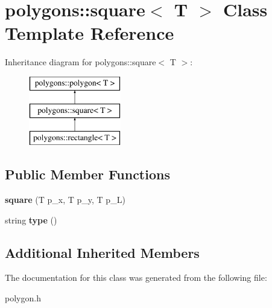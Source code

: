 \hypertarget{classpolygons_1_1square}{\section{polygons\-:\-:square$<$ T $>$ Class Template Reference}
\label{classpolygons_1_1square}
}
Inheritance diagram for polygons\-:\-:square$<$ T $>$\-:\begin{figure}[H]
\begin{center}
\leavevmode
\includegraphics[height=3.000000cm]{classpolygons_1_1square}
\end{center}
\end{figure}
\subsection*{Public Member Functions}
\begin{DoxyCompactItemize}
\item 
\hypertarget{classpolygons_1_1square_a33bfdb2f23cbe2ad48fe67a2c1bc94ae}{{\bfseries square} (T p\-\_\-x, T p\-\_\-y, T p\-\_\-\-L)}\label{classpolygons_1_1square_a33bfdb2f23cbe2ad48fe67a2c1bc94ae}

\item 
\hypertarget{classpolygons_1_1square_ab39ca97ab49022aba1c4773de116fc50}{string {\bfseries type} ()}\label{classpolygons_1_1square_ab39ca97ab49022aba1c4773de116fc50}

\end{DoxyCompactItemize}
\subsection*{Additional Inherited Members}


The documentation for this class was generated from the following file\-:\begin{DoxyCompactItemize}
\item 
polygon.\-h\end{DoxyCompactItemize}
